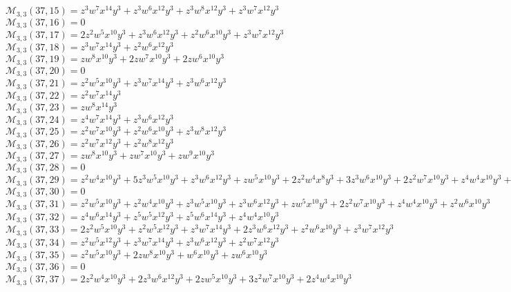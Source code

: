 $\mathcal{M}_{3,3}(37,15)=z^3w^7x^{14}y^3+z^3w^6x^{12}y^3+z^3w^8x^{12}y^3+z^3w^7x^{12}y^3$\\
$\mathcal{M}_{3,3}(37,16)=0$\\
$\mathcal{M}_{3,3}(37,17)=2z^2w^5x^{10}y^3+z^3w^6x^{12}y^3+z^2w^6x^{10}y^3+z^3w^7x^{12}y^3$\\
$\mathcal{M}_{3,3}(37,18)=z^3w^7x^{14}y^3+z^2w^6x^{12}y^3$\\
$\mathcal{M}_{3,3}(37,19)=zw^8x^{10}y^3+2zw^7x^{10}y^3+2zw^6x^{10}y^3$\\
$\mathcal{M}_{3,3}(37,20)=0$\\
$\mathcal{M}_{3,3}(37,21)=z^2w^5x^{10}y^3+z^3w^7x^{14}y^3+z^3w^6x^{12}y^3$\\
$\mathcal{M}_{3,3}(37,22)=z^2w^7x^{14}y^3$\\
$\mathcal{M}_{3,3}(37,23)=zw^8x^{14}y^3$\\
$\mathcal{M}_{3,3}(37,24)=z^4w^7x^{14}y^3+z^3w^6x^{12}y^3$\\
$\mathcal{M}_{3,3}(37,25)=z^2w^7x^{10}y^3+z^2w^6x^{10}y^3+z^3w^8x^{12}y^3$\\
$\mathcal{M}_{3,3}(37,26)=z^2w^7x^{12}y^3+z^2w^8x^{12}y^3$\\
$\mathcal{M}_{3,3}(37,27)=zw^8x^{10}y^3+zw^7x^{10}y^3+zw^9x^{10}y^3$\\
$\mathcal{M}_{3,3}(37,28)=0$\\
$\mathcal{M}_{3,3}(37,29)=z^2w^4x^{10}y^3+5z^3w^5x^{10}y^3+z^3w^6x^{12}y^3+zw^5x^{10}y^3+2z^2w^4x^8y^3+3z^3w^6x^{10}y^3+2z^2w^7x^{10}y^3+z^4w^4x^{10}y^3+z^2w^5x^8y^3$\\
$\mathcal{M}_{3,3}(37,30)=0$\\
$\mathcal{M}_{3,3}(37,31)=z^2w^5x^{10}y^3+z^2w^4x^{10}y^3+z^3w^5x^{10}y^3+z^3w^6x^{12}y^3+zw^5x^{10}y^3+2z^2w^7x^{10}y^3+z^4w^4x^{10}y^3+z^2w^6x^{10}y^3$\\
$\mathcal{M}_{3,3}(37,32)=z^4w^6x^{14}y^3+z^5w^5x^{12}y^3+z^5w^6x^{14}y^3+z^4w^4x^{10}y^3$\\
$\mathcal{M}_{3,3}(37,33)=2z^2w^5x^{10}y^3+z^2w^5x^{12}y^3+z^3w^7x^{14}y^3+2z^3w^6x^{12}y^3+z^2w^6x^{10}y^3+z^3w^7x^{12}y^3$\\
$\mathcal{M}_{3,3}(37,34)=z^2w^5x^{12}y^3+z^3w^7x^{14}y^3+z^3w^6x^{12}y^3+z^2w^7x^{12}y^3$\\
$\mathcal{M}_{3,3}(37,35)=z^2w^5x^{10}y^3+2zw^8x^{10}y^3+w^6x^{10}y^3+zw^6x^{10}y^3$\\
$\mathcal{M}_{3,3}(37,36)=0$\\
$\mathcal{M}_{3,3}(37,37)=2z^2w^4x^{10}y^3+2z^3w^6x^{12}y^3+2zw^5x^{10}y^3+3z^2w^7x^{10}y^3+2z^4w^4x^{10}y^3$\\
